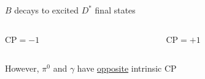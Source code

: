 \documentclass[dvipsnames]{beamer}
\begin{document}
\begin{frame}{$B$ decays to excited $D^*$ final states}
\begin{figure}[H]
\begin{subfigure}{0.45\textwidth}
    \end{subfigure}
  \end{figure}
  \vspace{-0.5cm}
  \begin{columns}
    \begin{column}{0.5\textwidth}
      \begin{center}
        CP$ = -1$
      \end{center}
    \end{column}
    \begin{column}{0.5\textwidth}
      \begin{center}
        CP$ = +1$
      \end{center}
    \end{column}
  \end{columns}
  \begin{center}
  {\large However, $\pi^0$ and $\gamma$ have \underline{opposite} intrinsic CP}
  \end{center}
  \vspace{0.56cm}
\end{frame}
\end{document}
